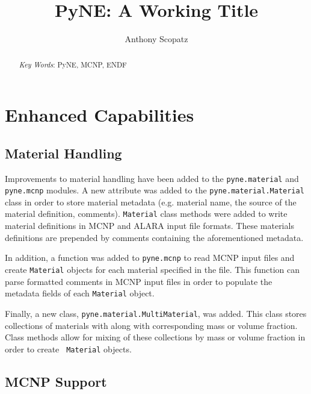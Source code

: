 \documentclass{ansconf}
\begin{document}
\title{PyNE: A Working Title}

\author{Anthony Scopatz}

\maketitle

\begin{abstract}
\raggedright

\emph{Key Words}: PyNE, MCNP, ENDF
\end{abstract}

\setlength{\baselineskip}{12pt}


\section{Enhanced Capabilities}

\subsection{Material Handling}

Improvements to material handling have been added to the \texttt{pyne.material}
and \texttt{pyne.mcnp} modules. A new attribute was added to the
\texttt{pyne.material.Material} class in order to store material metadata (e.g.
material name, the source of the material definition, comments).
\texttt{Material} class methods were added to write material definitions in MCNP
and ALARA \cite{wilson_alara:_1999} input file formats.  These materials
definitions are prepended by comments containing the aforementioned metadata. 

In addition, a function was added to \texttt{pyne.mcnp} to read MCNP input files and
create \texttt{Material} objects for each material specified in the file. This
function can parse formatted comments in MCNP input files in order to
populate the metadata fields of each \texttt{Material} object.

Finally, a new class, \texttt{pyne.material.MultiMaterial}, was added.  This
class stores collections of materials with along with corresponding mass or
volume fraction.  Class methods allow for mixing of these collections by mass
or volume fraction in order to create \texttt{ Material} objects.


\subsection{MCNP Support}
\end{document}
